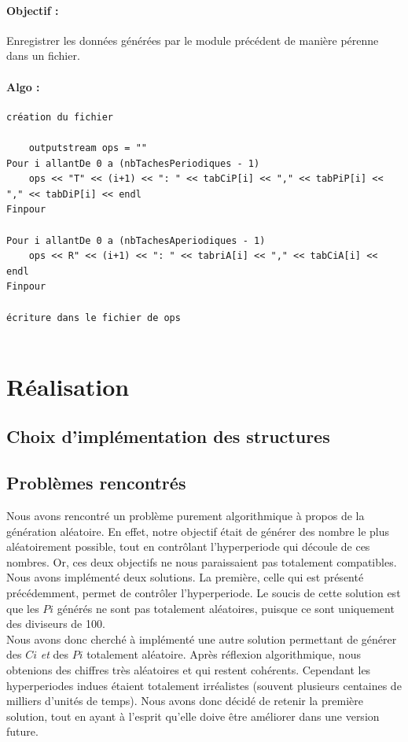		\paragraph{Objectif :} Enregistrer les données générées par le module précédent de manière pérenne dans un fichier.
		\paragraph{Algo :}
		\begin{verbatim}
création du fichier

	outputstream ops = ""
Pour i allantDe 0 a (nbTachesPeriodiques - 1)		
	ops << "T" << (i+1) << ": " << tabCiP[i] << "," << tabPiP[i] << "," << tabDiP[i] << endl
Finpour

Pour i allantDe 0 a (nbTachesAperiodiques - 1)
	ops << R" << (i+1) << ": " << tabriA[i] << "," << tabCiA[i] << endl
Finpour

écriture dans le fichier de ops
  
		\end{verbatim}

\section{Réalisation}
	\subsection{Choix d'implémentation des structures}
	
	\subsection{Problèmes rencontrés}
		Nous avons rencontré un problème purement algorithmique à propos de la génération aléatoire. En effet, notre objectif était de générer des nombre le plus aléatoirement possible, tout en contrôlant l'hyperperiode qui découle de ces nombres. Or, ces deux objectifs ne nous paraissaient pas totalement compatibles.\\
		
		Nous avons implémenté deux solutions. La première, celle qui est présenté précédemment, permet de contrôler l'hyperperiode. Le soucis de cette solution est que les $Pi$ générés ne sont pas totalement aléatoires, puisque ce sont uniquement des diviseurs de 100.\\
		
		Nous avons donc cherché à implémenté une autre solution permettant de générer des $Ci$ \emph{et} des $Pi$ totalement aléatoire. Après réflexion algorithmique, nous obtenions des chiffres très aléatoires et qui restent cohérents. Cependant les hyperperiodes indues étaient totalement irréalistes (souvent plusieurs centaines de milliers d'unités de temps). Nous avons donc décidé de retenir la première solution, tout en ayant à l'esprit qu'elle doive être améliorer dans une version future.

